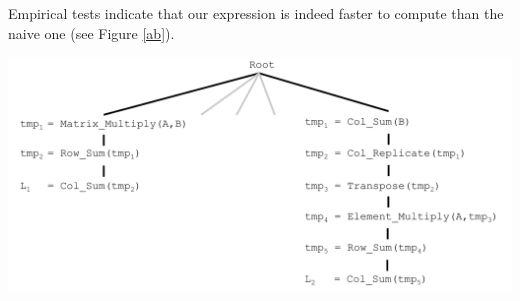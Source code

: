 {{Empirical tests indicate that our expression is indeed faster to
compute than the naive one (see Figure \ref{ab}).

\includegraphics[scale=0.4]{img/toy_tree.pdf}
}}









